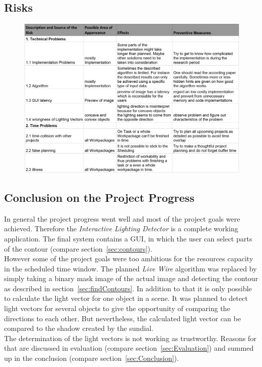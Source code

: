 \subsection{Risks} \label{sec:risks}
\begin{figure}[H] 
	\center 
	\includegraphics[scale = 0.7]{Images/risks.jpg}			
\end{figure}

\subsection{Conclusion on the Project Progress} \label{sec:pmCon}
In general the project progress went well and most of the project goals were achieved. Therefore the \textit{Interactive Lighting Detector} is a complete working application. The final system contains a GUI, in which the user can select parts of the contour (compare section~\ref{sec:contours}). \\
However some of the project goals were too ambitious for the resources capacity in the scheduled time window. The planned \textit{Live Wire} algorithm was replaced by simply taking a binary mask image of the actual image and detecting the contour as described in section~\ref{sec:findContours}. In addition to that it is only possible to calculate the light vector for one object in a scene. It was planned to detect light vectors for several objects to give the opportunity of comparing the directions to each other. But nevertheless, the calculated light vector can be compared to the shadow created by the sundial. \\
The determination of the light vectors is not working as trustworthy. Reasons for that are discussed in evaluation (compare section~\ref{sec:Evaluation}) and summed up in the conclusion (compare section~\ref{sec:Conclusion}).



\newpage

























